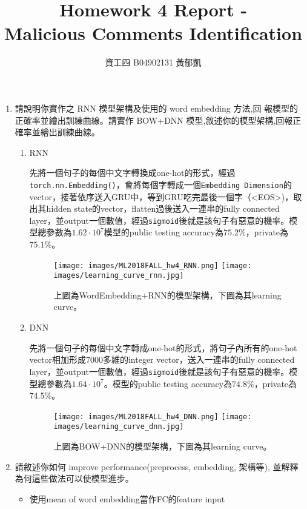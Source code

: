 \documentclass[12pt, a4paper]{article}
\author{資工四 B04902131 黃郁凱}
\title{\vspace{-2cm} Homework 4 Report - \\Malicious Comments Identification}
\begin{document}
\maketitle

\begin{enumerate}
\item 請說明你實作之 RNN 模型架構及使用的 word embedding 方法,回
報模型的正確率並繪出訓練曲線。請實作 BOW+DNN 模型,敘述你的模型架構,回報正確率並繪出訓練曲線。\par
\begin{enumerate}
    \item RNN\par
    先將一個句子的每個中文字轉換成one-hot的形式，經過\texttt{torch.nn.Embedding()}，會將每個字轉成一個\texttt{Embedding Dimension}的vector，接著依序送入GRU中，等到GRU吃完最後一個字（<EOS>)，取出其hidden state的vector，flatten過後送入一連串的fully connected layer，並output一個數值，經過\texttt{sigmoid}後就是該句子有惡意的機率。模型總參數為$1.62\cdot 10^{7}$模型的public testing accuracy為$75.2\%$，private為$75.1\%$。
    \begin{figure}[H]
        \centering
        \texttt{[image: images/ML2018FALL\_hw4\_RNN.png]}
        \texttt{[image: images/learning\_curve\_rnn.jpg]}
        \caption{上圖為WordEmbedding+RNN的模型架構，下圖為其learning curve。}
    \end{figure}
    \item DNN\par
    先將一個句子的每個中文字轉成one-hot的形式，將句子內所有的one-hot vector相加形成7000多維的integer vector，送入一連串的fully connected layer，並output一個數值，經過\texttt{sigmoid}後就是該句子有惡意的機率。模型總參數為$1.64\cdot 10^{7}$。模型的public testing accuracy為$74.8\%$，private為$74.5\%$。
    \begin{figure}[H]
        \centering
        \texttt{[image: images/ML2018FALL\_hw4\_DNN.png]}
        \texttt{[image: images/learning\_curve\_dnn.jpg]}
        \caption{上圖為BOW+DNN的模型架構，下圖為其learning curve。}
    \end{figure}
\end{enumerate}
\item 請敘述你如何 improve performance(preprocess, embedding, 架構等),
並解釋為何這些做法可以使模型進步。\par
\begin{itemize}
    \item 使用mean of word embedding當作FC的feature input\par

\end{itemize}
\end{enumerate}
\end{document}
